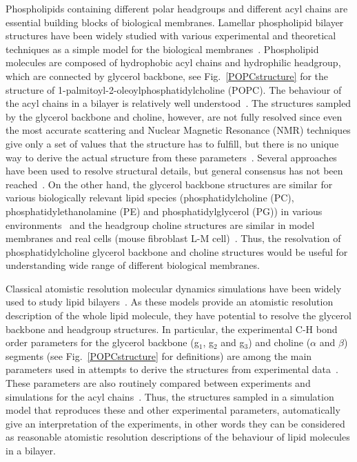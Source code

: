\documentclass[pre,aps,floatfix,authordate1-4,twocolumn]{revtex4-1}
\begin{document}
Phospholipids containing different polar headgroups and different acyl chains are essential building blocks of 
biological membranes. Lamellar phospholipid bilayer structures have been widely studied with various experimental 
and theoretical techniques as a simple model for the biological membranes~\cite{lipowsky95,tieleman97,klauda08,edholm08,tieleman10,piggot12,rabinovich13,marsh13}. 
Phospholipid molecules are composed of hydrophobic acyl chains and hydrophilic headgroup, which are connected by glycerol backbone,
see Fig.~\ref{POPCstructure} for the structure of 1-palmitoyl-2-oleoylphosphatidylcholine (POPC).
The behaviour of the acyl chains in a bilayer is relatively well understood~\cite{Israelachvili80,lipowsky95,tieleman97,klauda08,edholm08,tieleman10,marsh13}. 
The structures sampled by the glycerol backbone and choline, however, are not fully 
resolved since even the most accurate scattering and Nuclear Magnetic Resonance (NMR)
techniques give only a set of values that the structure has to fulfill, but
there is no unique way to derive the actual structure from these parameters~\cite{seelig77b,skarjune79,Israelachvili80,jacobs80,davis83,akutsu91,hong95b,semchyschyn04}.
Several approaches have been used to resolve structural details, but general consensus has not been reached~\cite{seelig77b,skarjune79,Israelachvili80,jacobs80,davis83,akutsu91,hong95b,semchyschyn04}. 
On the other hand, the glycerol backbone structures are similar for various biologically
relevant lipid species (phosphatidylcholine (PC), phosphatidylethanolamine (PE) and phosphatidylglycerol (PG)) 
in various environments~\cite{gally81} and the headgroup choline structures are similar in model membranes and
real cells (mouse fibroblast L-M cell)~\cite{scherer87}.
Thus, the resolvation of phosphatidylcholine glycerol backbone and choline structures would be 
useful for understanding wide range of different biological membranes.

Classical atomistic resolution molecular dynamics simulations have been widely used to study  
lipid bilayers~\cite{tieleman97,klauda08,edholm08,tieleman10,piggot12,rabinovich13}. As these models provide an atomistic
resolution description of the whole lipid molecule, they have potential to resolve the glycerol backbone and 
headgroup structures. In particular, the experimental C-H bond order parameters for the glycerol backbone 
(g$_1$, g$_2$ and g$_3$) and choline ($\alpha$ and $\beta$) segments (see Fig.~\ref{POPCstructure} for definitions) are among the main parameters used in
attempts to derive the structures from experimental data~\cite{seelig77b,skarjune79,jacobs80,davis83,akutsu91,hong95b,semchyschyn04}.
These parameters are also routinely compared between experiments and simulations for the acyl chains~\cite{tieleman97,klauda08,edholm08,tieleman10,piggot12}.
Thus, the structures sampled in a simulation model that reproduces these and other experimental parameters, automatically
give an interpretation of the experiments, in other words they can be considered as reasonable atomistic resolution descriptions of
the behaviour of lipid molecules in a bilayer.
\end{document}
